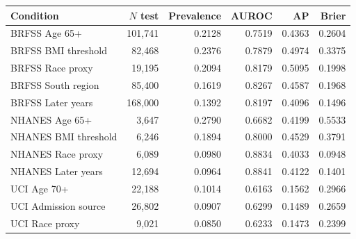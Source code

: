 \begin{tabular}{lrrrrr}
\toprule
Condition & $N$ test & Prevalence & AUROC & AP & Brier \\
\midrule
BRFSS Age 65+ & 101,741 & 0.2128 & 0.7519 & 0.4363 & 0.2604 \\
BRFSS BMI threshold & 82,468 & 0.2376 & 0.7879 & 0.4974 & 0.3375 \\
BRFSS Race proxy & 19,195 & 0.2094 & 0.8179 & 0.5095 & 0.1998 \\
BRFSS South region & 85,400 & 0.1619 & 0.8267 & 0.4587 & 0.1968 \\
BRFSS Later years & 168,000 & 0.1392 & 0.8197 & 0.4096 & 0.1496 \\
NHANES Age 65+ & 3,647 & 0.2790 & 0.6682 & 0.4199 & 0.5533 \\
NHANES BMI threshold & 6,246 & 0.1894 & 0.8000 & 0.4529 & 0.3791 \\
NHANES Race proxy & 6,089 & 0.0980 & 0.8834 & 0.4033 & 0.0948 \\
NHANES Later years & 12,694 & 0.0964 & 0.8841 & 0.4122 & 0.1401 \\
UCI Age 70+ & 22,188 & 0.1014 & 0.6163 & 0.1562 & 0.2966 \\
UCI Admission source & 26,802 & 0.0907 & 0.6299 & 0.1489 & 0.2659 \\
UCI Race proxy & 9,021 & 0.0850 & 0.6233 & 0.1473 & 0.2399 \\
\bottomrule
\end{tabular}
